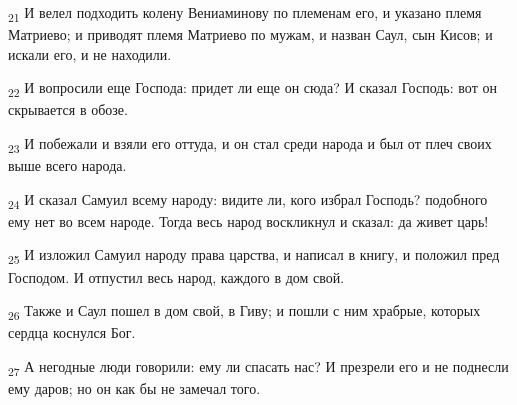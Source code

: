 \begin{tcolorbox}
\textsubscript{21} И велел подходить колену Вениаминову по племенам его, и указано племя Матриево; и приводят племя Матриево по мужам, и назван Саул, сын Кисов; и искали его, и не находили.
\end{tcolorbox}
\begin{tcolorbox}
\textsubscript{22} И вопросили еще Господа: придет ли еще он сюда? И сказал Господь: вот он скрывается в обозе.
\end{tcolorbox}
\begin{tcolorbox}
\textsubscript{23} И побежали и взяли его оттуда, и он стал среди народа и был от плеч своих выше всего народа.
\end{tcolorbox}
\begin{tcolorbox}
\textsubscript{24} И сказал Самуил всему народу: видите ли, кого избрал Господь? подобного ему нет во всем народе. Тогда весь народ воскликнул и сказал: да живет царь!
\end{tcolorbox}
\begin{tcolorbox}
\textsubscript{25} И изложил Самуил народу права царства, и написал в книгу, и положил пред Господом. И отпустил весь народ, каждого в дом свой.
\end{tcolorbox}
\begin{tcolorbox}
\textsubscript{26} Также и Саул пошел в дом свой, в Гиву; и пошли с ним храбрые, которых сердца коснулся Бог.
\end{tcolorbox}
\begin{tcolorbox}
\textsubscript{27} А негодные люди говорили: ему ли спасать нас? И презрели его и не поднесли ему даров; но он как бы не замечал того.
\end{tcolorbox}
